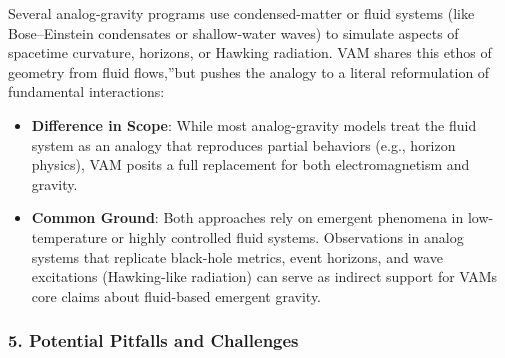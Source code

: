 Several analog-gravity programs use condensed-matter or fluid systems (like Bose–Einstein condensates or shallow-water waves) to simulate aspects of spacetime curvature, horizons, or Hawking radiation. VAM shares this ethos of \grqq geometry from fluid flows,\textquotedblright but pushes the analogy to a literal reformulation of fundamental interactions:

\begin{itemize}
    \item \textbf{Difference in Scope}: While most analog-gravity models treat the fluid system as an analogy that reproduces partial behaviors (e.g., horizon physics), VAM posits a full replacement for both electromagnetism and gravity.
    \item \textbf{Common Ground}: Both approaches rely on emergent phenomena in low-temperature or highly controlled fluid systems. Observations in analog systems that replicate black-hole metrics, event horizons, and wave excitations (Hawking-like radiation) can serve as indirect support for VAM\rqs s core claims about fluid-based emergent gravity.
\end{itemize}

\subsubsection*{5. Potential Pitfalls and Challenges}

